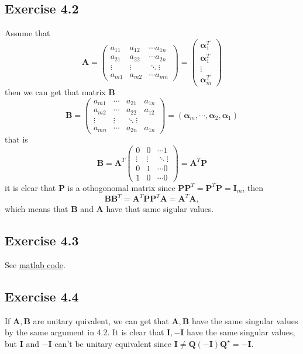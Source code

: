 \documentclass{article}
\begin{document}
\subsection{Exercise 4.2}
Assume that
$$
\bm{A} = \begin{pmatrix}
	a_{11} & a_{12} & \cdots a_{1n} \\
	a_{21} & a_{22} & \cdots a_{2n} \\
	\vdots & \vdots & \ddots \vdots \\
	a_{m1} & a_{m2} & \cdots a_{mn}
\end{pmatrix} = \begin{pmatrix}
	\bm{\alpha}_1^T \\
	\bm{\alpha}_1^T\\ 
	\vdots \\
	\bm{\alpha}_m^T\end{pmatrix}
$$
then we can get that matrix $\bm{B}$
$$
\bm{B} = \begin{pmatrix}
	a_{m1} & \cdots & a_{21} & a_{1n} \\
	a_{m2} & \cdots & a_{22} & a_{12}\\
	\vdots & \vdots & \ddots \vdots \\
	a_{mn} & \cdots & a_{2n} & a_{1n}
\end{pmatrix} = \left(\bm{\alpha}_m, \cdots, \bm{\alpha}_2, \bm{\alpha}_1 \right)
$$
that is 
$$
\bm{B} = \bm{A}^T \begin{pmatrix}
	0 & 0 & \cdots 1 \\
	\vdots & \vdots & \ddots \vdots \\
	0 & 1 & \cdots 0 \\
	1 & 0 & \cdots 0
\end{pmatrix} = \bm{A}^T \bm{P}
$$
it is clear that $\bm{P}$ is a othogonomal matrix since $\bm{P}\bm{P}^T = \bm{P}^T \bm{P} = \bm{I}_m$, then
$$
\bm{B} \bm{B}^T = \bm{A}^T \bm{P} \bm{P}^T \bm{A} = \bm{A}^T \bm{A},
$$
which means that $\bm{B}$ and $\bm{A}$ have that same sigular values.

\subsection{Exercise 4.3}
See \href{./exercise_4_3.m}{matlab code}.

\subsection{Exercise 4.4}
If $\bm{A}, \bm{B}$ are unitary quivalent, we can get that $\bm{A}, \bm{B}$ have the same singular values
by the same argument in 4.2. It is clear that $\bm{I}, -\bm{I}$ have the same singular values, but $\bm{I}$ and $-\bm{I}$ can't be unitary equivalent since $\bm{I} \neq \bm{Q} \left( - \bm
I\right) \bm{Q}^\star = -\bm{I}$.
\end{document}
